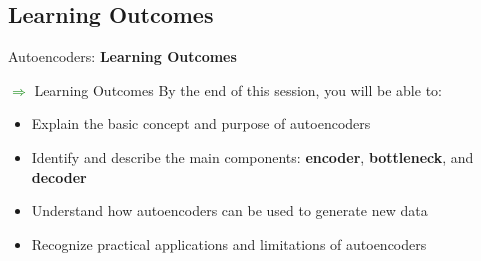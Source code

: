 \subsection{Learning Outcomes}
\begin{frame}{}
    \LARGE Autoencoders: \textbf{Learning Outcomes}
\end{frame}

\begin{frame}[allowframebreaks]{\textcolor{green}{$\Rightarrow$} Learning Outcomes}
    By the end of this session, you will be able to:
    \begin{itemize}
        \item Explain the basic concept and purpose of autoencoders
        \item Identify and describe the main components: \textbf{encoder}, \textbf{bottleneck}, and \textbf{decoder}
        \item Understand how autoencoders can be used to generate new data
        \item Recognize practical applications and limitations of autoencoders
    \end{itemize}
\end{frame}